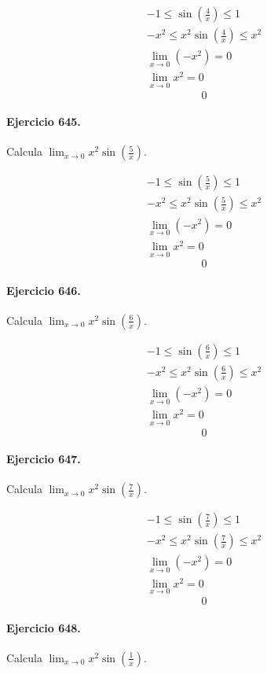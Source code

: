 \documentclass[11pt,a4paper]{article}
\begin{document}
\[
\begin{aligned}
-1\le\sin\left(\frac{4}{x}\right)\le1\\
-x^2\le x^2\sin\left(\frac{4}{x}\right)\le x^2\\
\lim_{x\to0}(-x^2)=0\\
\lim_{x\to0}x^2=0
\end{aligned}
\]
\[\boxed{0}\]


\paragraph{Ejercicio 645.} Calcula $\displaystyle\lim_{x\to0}x^2\sin\left(\frac{5}{x}\right)$.

\[
\begin{aligned}
-1\le\sin\left(\frac{5}{x}\right)\le1\\
-x^2\le x^2\sin\left(\frac{5}{x}\right)\le x^2\\
\lim_{x\to0}(-x^2)=0\\
\lim_{x\to0}x^2=0
\end{aligned}
\]
\[\boxed{0}\]


\paragraph{Ejercicio 646.} Calcula $\displaystyle\lim_{x\to0}x^2\sin\left(\frac{6}{x}\right)$.

\[
\begin{aligned}
-1\le\sin\left(\frac{6}{x}\right)\le1\\
-x^2\le x^2\sin\left(\frac{6}{x}\right)\le x^2\\
\lim_{x\to0}(-x^2)=0\\
\lim_{x\to0}x^2=0
\end{aligned}
\]
\[\boxed{0}\]


\paragraph{Ejercicio 647.} Calcula $\displaystyle\lim_{x\to0}x^2\sin\left(\frac{7}{x}\right)$.

\[
\begin{aligned}
-1\le\sin\left(\frac{7}{x}\right)\le1\\
-x^2\le x^2\sin\left(\frac{7}{x}\right)\le x^2\\
\lim_{x\to0}(-x^2)=0\\
\lim_{x\to0}x^2=0
\end{aligned}
\]
\[\boxed{0}\]


\paragraph{Ejercicio 648.} Calcula $\displaystyle\lim_{x\to0}x^2\sin\left(\frac{1}{x}\right)$.
\end{document}
